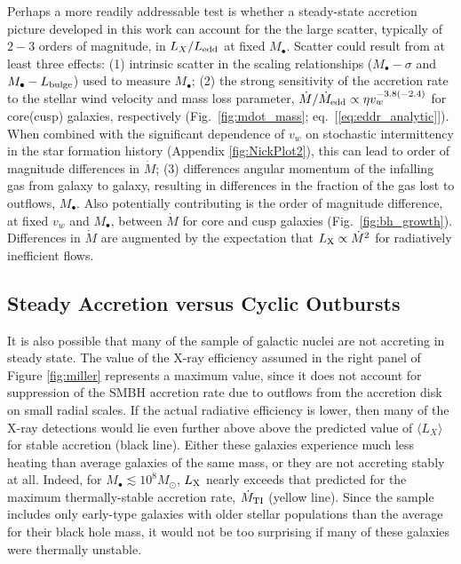 \documentclass[usenatbib,fleqn]{mn2e}
\newcommand{\Mbh}[1][]{M_{\bullet#1}}
\begin{document}
Perhaps a more readily addressable test is whether a steady-state accretion
picture developed in this work can account for the the large scatter, typically of $2-3$ orders of magnitude, in $L_{X}/L_{\rm
  edd}$ at fixed $M_{\bullet}$.  Scatter could result from at 
least three effects: (1) intrinsic scatter in the scaling relationships ($\Mbh-\sigma$ and $\Mbh-L_{\rm
  bulge}$) used to measure $\Mbh$; (2) the strong sensitivity of the accretion rate to
the stellar wind velocity and mass loss parameter, $\dot{M}/\dot{M}_{\rm edd} \propto
\eta v_{w}^{-3.8(-2.4)}$ for core(cusp) galaxies, respectively
(Fig.~\ref{fig:mdot_mass}; eq.~[\ref{eq:eddr_analytic}]).  When 
combined with the significant dependence of $v_w$ on stochastic
intermittency in the star formation history (Appendix
\ref{fig:NickPlot2}), this can lead to order of magnitude differences
in $\dot{M}$; (3) differences angular momentum of the infalling gas
from galaxy to galaxy, resulting in differences in the fraction of the
gas lost to outflows, $\Mbh$.  Also potentially contributing is the
order of magnitude difference, at fixed $v_w$ and $M_{\bullet}$,
between $\dot{M}$ for core and cusp galaxies
(Fig.~\ref{fig:bh_growth}).  Differences in $\dot{M}$ are augmented by
the expectation that $L_{\rm X} \propto \dot{M}^{2} $ for radiatively
inefficient flows. 





\subsection{Steady Accretion versus Cyclic Outbursts}
\label{sec:cycle}

It is also possible that many of the
\citet{Miller+15} sample of galactic nuclei are not accreting in steady state.  The
value of the X-ray efficiency assumed in the right panel of Figure \ref{fig:miller} represents a maximum value, since it does not account for suppression of the SMBH accretion rate due to outflows from the accretion disk on small
radial scales.  If the actual radiative efficiency is lower, then many of the X-ray detections would lie even further above above the predicted value of $\langle L_X \rangle$ for stable accretion (black line).  Either these
galaxies experience much less heating than average galaxies of the same mass, or they are not accreting stably
at all.  Indeed, for $M_{\bullet} \lesssim
10^{8}M_{\odot}$, $L_{\rm X}$ nearly exceeds that predicted for the
maximum thermally-stable accretion rate, $\dot{M}_{\rm TI}$ (yellow
line).  Since the \citet{Miller+15} sample includes only early-type galaxies with older stellar populations than the average for their black hole mass, it would not be too surprising if many of these galaxies were thermally unstable.
\end{document}

